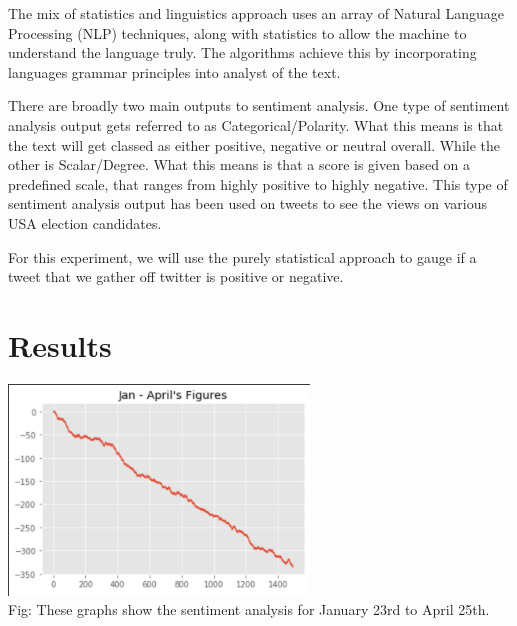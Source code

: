 \documentclass[a4paper,10pt]{article}
\begin{document}
The mix of statistics and linguistics approach uses an array of Natural Language Processing (NLP) techniques, along with statistics to allow the machine to understand the language truly. The algorithms achieve this by incorporating languages grammar principles into analyst of the text. 

There are broadly two main outputs to sentiment analysis. One type of sentiment analysis output gets referred to as Categorical/Polarity. What this means is that the text will get classed as either positive, negative or neutral overall. While the other is Scalar/Degree. What this means is that a score is given based on a predefined scale, that ranges from highly positive to highly negative. This type of sentiment analysis output has been used on tweets to see the views on various USA election candidates.

For this experiment, we will use the purely statistical approach to gauge if a tweet that we gather off twitter is positive or negative.


\section{Results}


\begin{center}
	\label{confusion_matrix}
	\includegraphics[width=8cm]{allresults2.png}
	\centering
	 \\Fig: These graphs show the sentiment analysis for January 23rd to April 25th. 
\end{center}
\end{document}
